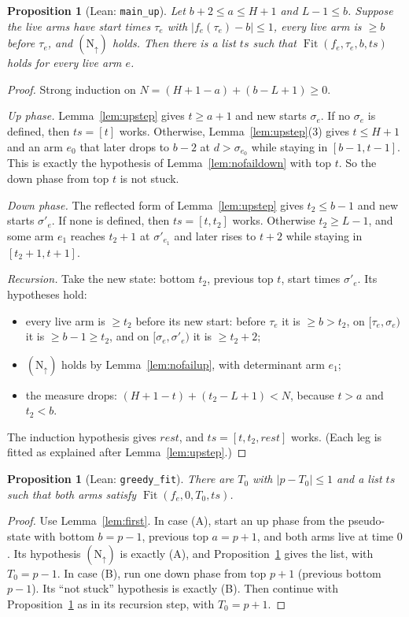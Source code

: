 \documentclass[11pt]{article}
\newtheorem{proposition}[theorem]{Proposition}
\theoremstyle{definition}
\theoremstyle{remark}
\newcommand{\Fit}{\operatorname{Fit}}
\newcommand{\lean}[1]{\texttt{#1}}
\begin{document}
\begin{proposition}[Lean: \lean{main\_up}]\label{prop:mainup}
Let $b+2\le a\le H+1$ and $L-1\le b$. Suppose the live arms have start times
$\tau_e$ with $|f_e(\tau_e)-b|\le1$, every live arm is $\ge b$ before
$\tau_e$, and $(\mathrm N_\uparrow)$ holds. Then there is a list $ts$ such that
$\Fit(f_e,\tau_e,b,ts)$ holds for every live arm $e$.
\end{proposition}
\begin{proof}
Strong induction on $N=(H+1-a)+(b-L+1)\ge0$.

\emph{Up phase.} Lemma~\ref{lem:upstep} gives $t\ge a+1$ and new starts
$\sigma_e$. If no $\sigma_e$ is defined, then $ts=[t]$ works. Otherwise,
Lemma~\ref{lem:upstep}(3) gives $t\le H+1$ and an arm $e_0$ that later drops to
$b-2$ at $d>\sigma_{e_0}$ while staying in $[b-1,t-1]$. This is exactly the
hypothesis of Lemma~\ref{lem:nofaildown} with top $t$. So the down phase from
top $t$ is not stuck.

\emph{Down phase.} The reflected form of Lemma~\ref{lem:upstep} gives
$t_2\le b-1$ and new starts $\sigma'_e$. If none is defined, then
$ts=[t,t_2]$ works. Otherwise $t_2\ge L-1$, and some arm $e_1$ reaches
$t_2+1$ at $\sigma'_{e_1}$ and later rises to $t+2$ while staying in
$[t_2+1,t+1]$.

\emph{Recursion.} Take the new state: bottom $t_2$, previous top $t$, start
times $\sigma'_e$. Its hypotheses hold:
\begin{itemize}
\item every live arm is $\ge t_2$ before its new start: before $\tau_e$ it is
$\ge b>t_2$, on $[\tau_e,\sigma_e)$ it is $\ge b-1\ge t_2$, and on
$[\sigma_e,\sigma'_e)$ it is $\ge t_2+2$;
\item $(\mathrm N_\uparrow)$ holds by Lemma~\ref{lem:nofailup}, with
determinant arm $e_1$;
\item the measure drops: $(H+1-t)+(t_2-L+1)<N$, because $t>a$ and $t_2<b$.
\end{itemize}
The induction hypothesis gives $\mathit{rest}$, and $ts=[t,t_2,\mathit{rest}]$
works. (Each leg is fitted as explained after Lemma~\ref{lem:upstep}.)
\end{proof}

\begin{proposition}[Lean: \lean{greedy\_fit}]\label{prop:greedy}
There are $T_0$ with $|p-T_0|\le1$ and a list $ts$ such that both arms satisfy
$\Fit(f_e,0,T_0,ts)$.
\end{proposition}
\begin{proof}
Use Lemma~\ref{lem:first}. In case (A), start an up phase from the
pseudo-state with bottom $b=p-1$, previous top $a=p+1$, and both arms live at
time $0$. Its hypothesis $(\mathrm N_\uparrow)$ is exactly (A), and
Proposition~\ref{prop:mainup} gives the list, with $T_0=p-1$. In case (B), run
one down phase from top $p+1$ (previous bottom $p-1$). Its ``not stuck''
hypothesis is exactly (B). Then continue with Proposition~\ref{prop:mainup} as
in its recursion step, with $T_0=p+1$.
\end{proof}
\end{document}
